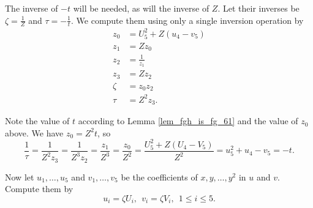 The inverse of $-t$ will be needed, as will the inverse of $Z$.
Let their inverses be $\zeta = \frac 1 Z$ and $\tau = -\frac 1 t$.
We compute them using only a single inversion operation by
\begin{align*}
  z_0 &= U_5^2 + Z(u_4 - v_5) \\
  z_1 &= Zz_0 \\
  z_2 &= \frac 1 {z_1} \\
  z_3 &= Zz_2 \\
  \zeta &= z_0z_2 \\
  \tau  &= Z^2z_3.
\end{align*}
\begin{comment}
\begin{align*}
  z_0 &= U_5^2 - Z(U_5c_8 - u_4 + v_5) \\
  z_1 &= Zz_0 \\
  z_2 &= \frac 1 {z_1} \\
  z_3 &= Zz_2 \\
  \zeta &= z_0z_2 \\
  \tau  &= Z^2z_3.
\end{align*}
\end{comment}
Note the value of $t$ according to Lemma \ref{lem_fgh_is_fg_61} and the value of $z_0$ above.
We have $z_0 = Z^2t$, so
\[ \frac 1 \tau = \frac 1 {Z^2z_3} 
                = \frac 1 {Z^3z_2} 
                = \frac {z_1} {Z^3} 
                = \frac {z_0} {Z^2}
                = \frac {U_5^2 + Z(U_4 - V_5)} {Z^2}
                = u_5^2 + u_4 - v_5
                = -t. \]
\begin{comment}
\[ \frac 1 \tau = \frac 1 {Z^2z_3} 
                = \frac 1 {Z^3z_2} 
                = \frac {z_1} {Z^3} 
                = \frac {z_0} {Z^2}
                = \frac {U_5^2 - Z(U_5c_8 - U_4 + V_5)} {Z^2}
                = u_5^2 - u_5c_8 + u_4 - v_5
                = -t. \]
\end{comment}
Now let $u_1, \ldots, u_5$ and $v_1, \ldots, v_5$ be the coefficients of $x, y, \ldots, y^2$ in $u$ and $v$.
Compute them by
\[ u_i = \zeta U_i, ~~v_i = \zeta V_i, ~~1 \leq i \leq 5. \]

